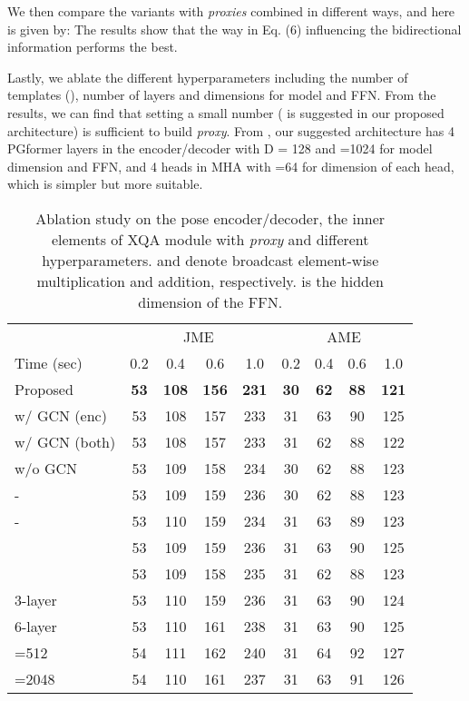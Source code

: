 \documentclass[10pt,twocolumn,letterpaper]{article}
\begin{document}
We then compare the variants with \textit{proxies} combined in different ways, and here   is given by: 
The results show that the way in Eq. (6) influencing the bidirectional information performs the best. 


Lastly, we ablate the different hyperparameters including the number of templates (), number of layers and dimensions for model and FFN.
From the results, we can find that setting  a small number ( is suggested in our proposed architecture) is sufficient to build \textit{proxy}. 
From , our suggested architecture has 4 PGformer layers in the encoder/decoder with D = 128 and =1024 for model dimension and FFN, and 4 heads in MHA with =64 for dimension of each head, which is simpler but more suitable. 


\begin{table}[ht]
    \setlength\tabcolsep{4.0pt}
    \caption{Ablation study on the pose encoder/decoder, the inner elements of XQA module with \textit{proxy} and different hyperparameters. 
 and  denote broadcast element-wise multiplication and addition, respectively. 
     is the hidden dimension of the FFN.  }
\label{tab:ablation2}
    \begin{center}
\small
    \begin{tabular}{l|cccc|cccc}
\hline
        & \multicolumn{4}{c|}{JME} & \multicolumn{4}{c}{AME} \\
        \cline{2-9}
        Time (sec) & 0.2 & 0.4 & 0.6 & 1.0 & 0.2 & 0.4 & 0.6 & 1.0 \\
        \hline
        Proposed & \textbf{53} & \textbf{108} & \textbf{156} & \textbf{231} & \textbf{30} & \textbf{62} & \textbf{88} & \textbf{121}  \\
        \hline
        w/ GCN (enc) & 53 & 108 & 157 & 233 & 31 & 63 & 90 &  125  \\
        w/ GCN (both) & 53 & 108 & 157 & 233 & 31 & 62 & 88 & 122  \\
        w/o GCN &  53 & 109 & 158 & 234 & 30 & 62 & 88 & 123  \\
        \hline
        -  & 53 & 109 & 159 & 236 & 30 & 62 & 88 & 123  \\
        -  & 53 & 110 & 159 & 234 & 31 & 63 & 89 & 123  \\
        \hline
         & 53 & 109 & 159 & 236 & 31 & 63 & 90 & 125 \\
         & 53 & 109 & 158 & 235 & 31 & 62 & 88 & 123 \\
        3-layer & 53 & 110 & 159 & 236 & 31 & 63 & 90 & 124  \\
        6-layer & 53 & 110 & 161 & 238 & 31 & 63 & 90 & 125  \\
=512 & 54 & 111 & 162 & 240 & 31 & 64 & 92 & 127 \\
        =2048 & 54 & 110 & 161 & 237 & 31 & 63 & 91 & 126 \\
        \hline
    \end{tabular}
    \end{center}
\end{table}
\end{document}

